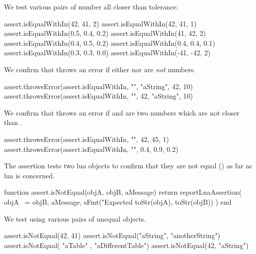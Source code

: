 
We test various pairs of number all closer than tolerance. 

\startLuaTest
  assert.isEqualWithIn(42, 41, 2)
  assert.isEqualWithIn(42, 41, 1)
  assert.isEqualWithIn(0.5, 0.4, 0.2)
  assert.isEqualWithIn(41, 42, 2)
  assert.isEqualWithIn(0.4, 0.5, 0.2)
  assert.isEqualWithIn(0.4, 0.4, 0.1)
  assert.isEqualWithIn(0.3, 0.3, 0.0)
  assert.isEqualWithIn(-41, -42, 2)
\stopLuaTest
\stopTestCase


We confirm that  throws an error if either 
 nor  are \emph{not} numbers.

\startLuaTest
  assert.throwsError(assert.isEqualWithIn, "", "aString", 42, 10)
  assert.throwsError(assert.isEqualWithIn, "", 42, "aString", 10)
\stopLuaTest
\stopTestCase


We confirm that  throws an error if  
and  are two numbers which are not closer than 
. 

\startLuaTest
  assert.throwsError(assert.isEqualWithIn, "", 42, 45, 1)
  assert.throwsError(assert.isEqualWithIn, "", 0.4, 0.9, 0.2)
\stopLuaTest
\stopTestCase

\stopTestSuite


The  assertion tests two lua objects to confirm 
that they are not equal (\type{~=}) as far as lua is concerned. 

\startLuaCode
function assert.isNotEqual(objA, objB, aMessage)
  return reportLuaAssertion(
    objA ~= objB,
    aMessage,
    sFmt("Expected %
      toStr(objA), toStr(objB))
  )
end
\stopLuaCode


We test using various pairs of unequal objects.

\startLuaTest
  assert.isNotEqual(42, 41)
  assert.isNotEqual("aString", "anotherString")
  assert.isNotEqual({ "aTable" }, { "aDifferentTable"})
  assert.isNotEqual(42, "aString")
\stopLuaTest
\stopTestCase


